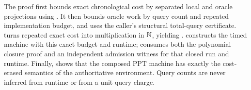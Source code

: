 The proof first bounds exact chronological cost by separated local and oracle
projections using .  It then bounds oracle work by query
count and repeated implementation budget, and uses the caller's structural
total-query certificate.   turns repeated exact cost
into multiplication in \(\mathbb{N}\), yielding .
 constructs the timed machine with this exact
budget and runtime;  consumes both the
polynomial closure proof and an independent admission witness for that closed
run and runtime.  Finally,
 shows that the composed PPT machine has
exactly the cost-erased semantics of the authoritative environment.  Query
counts are never inferred from runtime or from a unit query charge.
